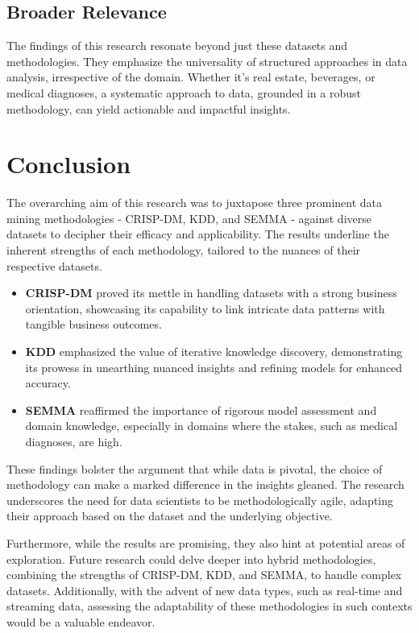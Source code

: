 \documentclass{article}
\begin{document}
\subsection{Broader Relevance}
The findings of this research resonate beyond just these datasets and methodologies. They emphasize the universality of structured approaches in data analysis, irrespective of the domain. Whether it's real estate, beverages, or medical diagnoses, a systematic approach to data, grounded in a robust methodology, can yield actionable and impactful insights.


\section{Conclusion}

The overarching aim of this research was to juxtapose three prominent data mining methodologies - CRISP-DM, KDD, and SEMMA - against diverse datasets to decipher their efficacy and applicability. The results underline the inherent strengths of each methodology, tailored to the nuances of their respective datasets.

\begin{itemize}
    \item \textbf{CRISP-DM} proved its mettle in handling datasets with a strong business orientation, showcasing its capability to link intricate data patterns with tangible business outcomes.
    \item \textbf{KDD} emphasized the value of iterative knowledge discovery, demonstrating its prowess in unearthing nuanced insights and refining models for enhanced accuracy.
    \item \textbf{SEMMA} reaffirmed the importance of rigorous model assessment and domain knowledge, especially in domains where the stakes, such as medical diagnoses, are high.
\end{itemize}

These findings bolster the argument that while data is pivotal, the choice of methodology can make a marked difference in the insights gleaned. The research underscores the need for data scientists to be methodologically agile, adapting their approach based on the dataset and the underlying objective.

Furthermore, while the results are promising, they also hint at potential areas of exploration. Future research could delve deeper into hybrid methodologies, combining the strengths of CRISP-DM, KDD, and SEMMA, to handle complex datasets. Additionally, with the advent of new data types, such as real-time and streaming data, assessing the adaptability of these methodologies in such contexts would be a valuable endeavor.
\end{document}
